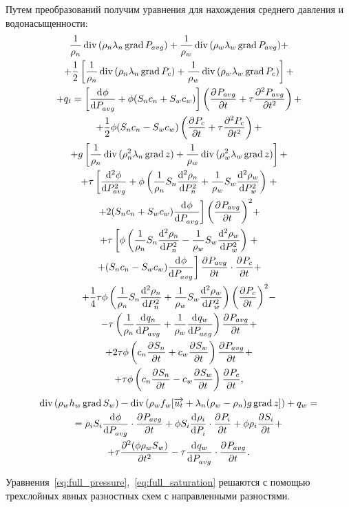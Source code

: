 Путем преобразований получим уравнения для нахождения
среднего давления и водонасыщенности:
\begin{equation} \label{eq:full_pressure}
 \begin{gathered}
   \frac{1}{\rho_n} \diver{ (\rho_n\lambda_n\grad{ P_{avg}})} + \frac{1}{\rho_w} \diver{ (\rho_w\lambda_w\grad{ P_{avg}})}  +\\
   + \frac{1}{2} \left[ \frac{1}{\rho_n} \diver{ (\rho_n\lambda_n\grad{ P_c})} + \frac{1}{\rho_w} \diver{ (\rho_w\lambda_w\grad{ P_c})} \right]  +\\
   + q_t = \left[ \dd{\phi}{P_{avg}} + \phi (S_n c_n + S_w c_w) \right] \left( \pd{P_{avg}}{t} + \tau \pd[2]{P_{avg}}{t} \right) +\\
   + \frac{1}{2} \phi (S_n c_n - S_w c_w) \left( \pd{P_{c}}{t} + \tau \pd[2]{P_c}{t} \right) +\\
   + g \left[ \frac{1}{\rho_n} \diver{ (\rho_n^2\lambda_n\grad{ z})} + \frac{1}{\rho_w} \diver{ (\rho_w^2\lambda_w\grad{ z})} \right] +\\
   + \tau \left[ \dd[2]{\phi}{P_{avg}} + \phi \left( \frac{1}{\rho_n} S_n \dd[2]{\rho_n}{P_n} + \frac{1}{\rho_w} S_w \dd[2]{\rho_w}{P_w} \right) \right. + \\
   \left. + 2(S_n c_n + S_w c_w) \dd{\phi}{P_{avg}} \right] {\left( \pd{P_{avg}}{t}\right) }^2 +\\
   + \tau \left[ \phi \left( \frac{1}{\rho_n} S_n \dd[2]{\rho_n}{P_n} - \frac{1}{\rho_w} S_w \dd[2]{\rho_w}{P_w} \right) \right. +\\
   \left. + (S_n c_n - S_w c_w) \dd{\phi}{P_{avg}} \right] \pd{P_{avg}}{t} \cdot \pd{P_c}{t} +\\
   + \frac{1}{4} \tau \phi \left( \frac{1}{\rho_n} S_n \dd[2]{\rho_n}{P_n} + \frac{1}{\rho_w} S_w \dd[2]{\rho_w}{P_w} \right) {\left( \pd{P_c}{t}\right) }^2 -\\
  - \tau \left(\frac{1}{\rho_n}\dd{q_n}{P_{avg}} + \frac{1}{\rho_w}\dd{q_w}{P_{avg}}\right) \pd{P_{avg}}{t} +\\
   + 2 \tau \phi \left(c_n \pd{S_n}{t} + c_w \pd{S_w}{t} \right) \pd{P_{avg}}{t}+ \\
   + \tau \phi \left(c_n \pd{S_n}{t} - c_w \pd{S_w}{t} \right) \pd{P_c}{t},
 \end{gathered}
\end{equation}
\begin{equation} \label{eq:full_saturation}
 \begin{gathered}
  \diver{(\rho_w h_w \grad{ S_w})} - \diver{(\rho_w f_w[\overrightarrow{u_t} + \lambda_n(\rho_w - \rho_n)g \grad{ z}])} + q_w =\\
  = \rho_i S_i \dd{\phi}{P_{avg}} \cdot \pd{P_{avg}}{t} + \phi S_i \dd{\rho_i}{P_i} \cdot \pd{P_i}{t} + \phi \rho_i \pd{S_i}{t} +\\
  + \tau \pd[2]{(\phi \rho_w S_w)}{t} - \tau \dd{q_w}{P_{avg}} \cdot \pd{P_{avg}}{t}.
 \end{gathered}
\end{equation}

Уравнения~\eqref{eq:full_pressure},~\eqref{eq:full_saturation} решаются с помощью трехслойных явных разностных схем с направленными разностями.
